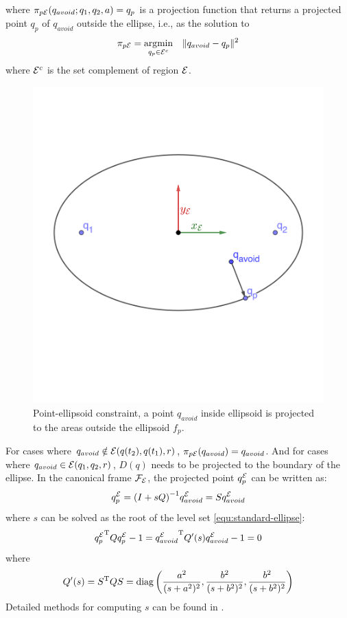 \documentclass[journal]{IEEEtran}  %
\begin{document}
where $\pi_{p\mathcal{E}}(q_{avoid};q_1,q_2,a) = q_p$ is a projection function that returns a projected point $q_p$ of $q_{avoid}$ outside the ellipse, i.e., as the solution to
\begin{equation}\label{eq:ellipse-point-projection}
\pi_{p\mathcal{E}}=\operatorname*{\arg\!\min}_{q_p\in\mathcal{E}^c} \quad \lVert q_{avoid}-q_p\rVert^2 
\end{equation}
where $\mathcal{E}^{c}$ is the set complement of region $\mathcal{E}$.
  
\begin{figure}[htbp]
\begin{center}
\includegraphics[width=0.6\linewidth, trim = 0.3cm 1.3cm 0.3cm 1.3cm, clip]{Ellipse2point}
\caption{Point-ellipsoid constraint, a point $q_{avoid}$ inside ellipsoid is projected to the areas outside the ellipsoid $f_{p}$.}
\label{fig:Ellipse-to-point}
\end{center}
\end{figure}

For cases where $q_{avoid} \notin \mathcal{E}(q(t_2),q(t_1),r)$, $\pi_{p\mathcal{E}}(q_{avoid}) = q_{avoid}$. And for cases where $q_{avoid} \in \mathcal{E}(q_1,q_2,r)$, $D(q)$ needs to be projected to the boundary of the ellipse. 
In the canonical frame $\mathcal{F}_{\mathcal{E}}$, the projected point $q^{\mathcal{E}}_{p}$ can be written as:
  \begin{equation}
  	q^{\mathcal{E}}_{p} = {(I+sQ)}^{-1} q^{\mathcal{E}}_{avoid} = S q^{\mathcal{E}}_{avoid}
  \end{equation}
where $s$ can be solved as the root of the level set \eqref{equ:standard-ellipse}:
  \begin{equation}
    {q^{\mathcal{E}}_p}^\mathrm{T} Q q^{\mathcal{E}}_p-1={q^{\mathcal{E}}_{avoid}}^\mathrm{T} Q'(s) q^{\mathcal{E}}_{avoid} -1=0
  \end{equation}
  where
  \begin{equation}
    Q'(s) =S^\mathrm{T} Q S = \operatorname{diag}\left(\frac{a^{2}}{(s+a^{2})^2}, \frac{b^{2}}{(s+b^{2})^2},\frac{b^{2}}{(s+b^{2})^2}\right)
  \end{equation}
 Detailed methods for computing $s$ can be found in \cite{yang2021multi,yang2020multi,eberly}. 
\end{document}
